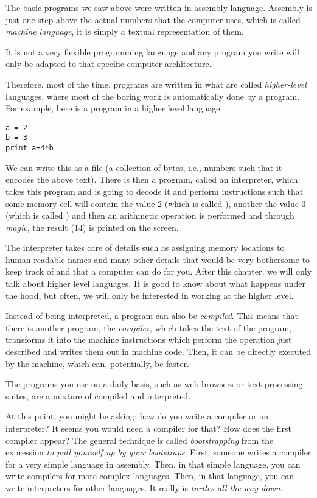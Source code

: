 The basic programs we saw above were written in assembly language. Assembly is
just one step above the actual numbers that the computer uses, which is called
\emph{machine language}, it is simply a textual representation of them.

It is not a very flexible programming language and any program you write will
only be adapted to that specific computer architecture.

Therefore, most of the time, programs are written in what are called
\emph{higher-level} languages, where most of the boring work is automatically
done by a program. For example, here is a program in a higher level language

\begin{verbatim}
a = 2
b = 3
print a+4*b
\end{verbatim}

We can write this as a file (a collection of bytes, i.e., numbers such that it
encodes the above text). There is then a program, called an interpreter, which
takes this program and is going to decode it and perform instructions such that
some memory cell will contain the value 2 (which is called ), another
the value 3 (which is called ) and then an arithmetic operation is
performed and through \emph{magic}, the result (14) is printed on the screen.

The interpreter takes care of details such as assigning memory locations to
human-readable names and many other details that would be very bothersome to
keep track of and that a computer can do for you. After this chapter, we will
only talk about higher level languages. It is good to know about what happens
under the hood, but often, we will only be interested in working at the higher
level.

Instead of being interpreted, a program can also be \emph{compiled}. This means
that there is another program, the \emph{compiler}, which takes the text of the
program, transforms it into the machine instructions which perform the
operation just described and writes them out in machine code. Then, it can be
directly executed by the machine, which can, potentially, be faster.

The programs you use on a daily basis, such as web browsers or text processing
suites, are a mixture of compiled and interpreted.

At this point, you might be asking: how do you write a compiler or an
interpreter? It seems you would need a compiler for that? How does the first
compiler appear? The general technique is called \emph{bootstrapping} from the
expression \emph{to pull yourself up by your bootstraps}. First, someone writes
a compiler for a very simple language in assembly. Then, in that simple
language, you can write compilers for more complex languages. Then, in that
language, you can write interpreters for other languages. It really is
\emph{turtles all the way down}.

